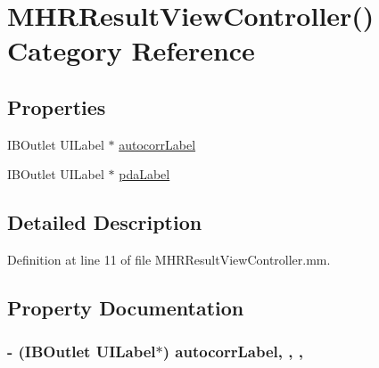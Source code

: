 \hypertarget{category_m_h_r_result_view_controller_07_08}{\section{M\+H\+R\+Result\+View\+Controller() Category Reference}
\label{category_m_h_r_result_view_controller_07_08}
}
\subsection*{Properties}
\begin{DoxyCompactItemize}
\item 
I\+B\+Outlet U\+I\+Label $\ast$ \hyperlink{category_m_h_r_result_view_controller_07_08_a47e15cc9dd4edba89fabe5631de70baa}{autocorr\+Label}
\item 
I\+B\+Outlet U\+I\+Label $\ast$ \hyperlink{category_m_h_r_result_view_controller_07_08_a4d91971b1a4e42c64a1c0d2790b1fe53}{pda\+Label}
\end{DoxyCompactItemize}


\subsection{Detailed Description}


Definition at line 11 of file M\+H\+R\+Result\+View\+Controller.\+mm.



\subsection{Property Documentation}
\hypertarget{category_m_h_r_result_view_controller_07_08_a47e15cc9dd4edba89fabe5631de70baa}{
\subsubsection[{autocorr\+Label}]{\setlength{\rightskip}{0pt plus 5cm}-\/ (I\+B\+Outlet U\+I\+Label$\ast$) autocorr\+Label\hspace{0.3cm}{\ttfamily [read]}, {\ttfamily [write]}, {\ttfamily [nonatomic]}, {\ttfamily [weak]}}}\label{category_m_h_r_result_view_controller_07_08_a47e15cc9dd4edba89fabe5631de70baa}


